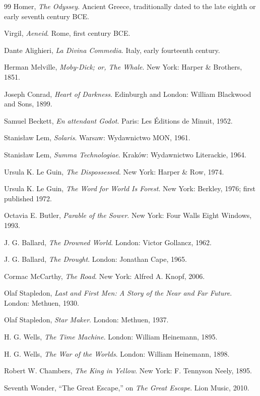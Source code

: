 \documentclass[11pt,oneside]{book}
\theoremstyle{definition}
\theoremstyle{remark}
\begin{document}
\begin{thebibliography}{99}
 Homer, \emph{The Odyssey}. Ancient Greece, traditionally dated to the late eighth or early
  seventh century BCE.

 Virgil, \emph{Aeneid}. Rome, first century BCE.

 Dante Alighieri, \emph{La Divina Commedia}. Italy, early fourteenth century.

 Herman Melville, \emph{Moby-Dick; or, The Whale}. New York: Harper \& Brothers, 1851.

 Joseph Conrad, \emph{Heart of Darkness}. Edinburgh and London: William Blackwood and Sons, 1899.

 Samuel Beckett, \emph{En attendant Godot}. Paris: Les \'Editions de Minuit, 1952.

 Stanis\l aw Lem, \emph{Solaris}. Warsaw: Wydawnictwo MON, 1961.

 Stanis\l aw Lem, \emph{Summa Technologiae}. Krak\'ow: Wydawnictwo Literackie, 1964.

 Ursula K. Le Guin, \emph{The Dispossessed}. New York: Harper \& Row, 1974.

 Ursula K. Le Guin, \emph{The Word for World Is Forest}. New York: Berkley, 1976; first published
  1972.

 Octavia E. Butler, \emph{Parable of the Sower}. New York: Four Walls Eight Windows, 1993.

 J. G. Ballard, \emph{The Drowned World}. London: Victor Gollancz, 1962.

 J. G. Ballard, \emph{The Drought}. London: Jonathan Cape, 1965.

 Cormac McCarthy, \emph{The Road}. New York: Alfred A. Knopf, 2006.

 Olaf Stapledon, \emph{Last and First Men: A Story of the Near and Far Future}. London: Methuen,
  1930.

 Olaf Stapledon, \emph{Star Maker}. London: Methuen, 1937.

 H. G. Wells, \emph{The Time Machine}. London: William Heinemann, 1895.

 H. G. Wells, \emph{The War of the Worlds}. London: William Heinemann, 1898.

 Robert W. Chambers, \emph{The King in Yellow}. New York: F. Tennyson Neely, 1895.

 Seventh Wonder, ``The Great Escape,'' on \emph{The Great Escape}. Lion Music, 2010.

\end{thebibliography}
\end{document}
